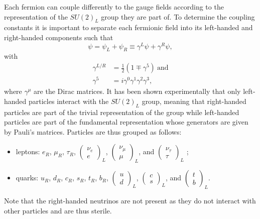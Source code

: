     Each fermion can couple differently to the gauge fields according to the representation of the $ SU(2)_L $ group they are part of. To determine the coupling constants it is important to separate each fermionic field into its left-handed and right-handed components such that
    \begin{equation}
      \psi = \psi_L + \psi_R \equiv \gamma^L \psi + \gamma^R \psi ,
    \end{equation}
    with
    \begin{align}
      \gamma^{L/R} & = \frac{1}{2} \left( 1 \mp \gamma^5 \right) \ \text{and} \\
      \gamma^5 & = i \gamma^0 \gamma^1 \gamma^2 \gamma^3 ,
    \end{align}
    where $ \gamma^\mu $ are the Dirac matrices. It has been shown experimentally that only left-handed particles interact with the $ SU(2)_L $ group, meaning that right-handed particles are part of the trivial representation of the group while left-handed particles are part of the fundamental representation whose generators are given by Pauli's matrices. Particles are thus grouped as follows:
    \begin{itemize}
      \item leptons: $ e_R $, $ \mu_R $, $ \tau_R $, $ \left( \begin{matrix} \nu_e \\ e \end{matrix} \right)_L $, $ \left( \begin{matrix} \nu_\mu \\ \mu \end{matrix} \right)_L $, and $ \left( \begin{matrix} \nu_\tau \\ \tau \end{matrix} \right)_L $ ;
      \item quarks: $ u_R $, $ d_R $, $ c_R $, $ s_R $, $ t_R $, $ b_R $, $ \left( \begin{matrix} u \\ d \end{matrix} \right)_L $, $ \left( \begin{matrix} c \\ s \end{matrix} \right)_L $, and $ \left( \begin{matrix} t \\ b \end{matrix} \right)_L $.
    \end{itemize}
    Note that the right-handed neutrinos are not present as they do not interact with other particles and are thus sterile. \\

